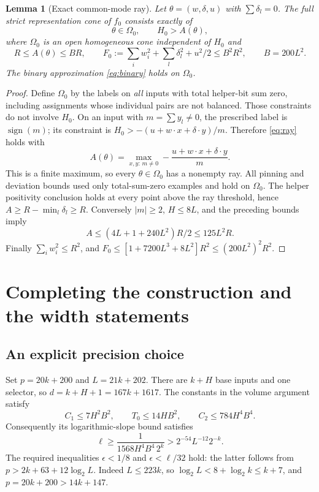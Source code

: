 \documentclass[11pt]{article}
\newtheorem{lemma}[theorem]{Lemma}
\newcommand{\sgn}{\operatorname{sign}}
\begin{document}
\begin{lemma}[Exact common-mode ray]\label{lem:ray}
Let $\theta=(w,\delta,u)$ with $\sum\delta_l=0$. The full strict
representation cone of $f_0$ consists exactly of
\begin{equation}\label{eq:ray}
 \theta\in\Omega_0,\qquad H_0>A(\theta),
\end{equation}
where $\Omega_0$ is an open homogeneous cone independent of $H_0$ and
\begin{equation}\label{eq:raybounds}
 R\le A(\theta)\le BR,\qquad
 F_0:=\sum_iw_i^2+\sum_l\delta_l^2+u^2/2\le B^2R^2,
 \qquad B=200L^2.
\end{equation}
The binary approximation \eqref{eq:binary} holds on $\Omega_0$.
\end{lemma}
\begin{proof}
Define $\Omega_0$ by the labels on \emph{all} inputs with total
helper-bit sum zero, including assignments whose individual pairs are
not balanced. Those constraints do not involve $H_0$. On an input with
$m=\sum y_l\ne0$, the prescribed label is $\sgn(m)$; its constraint is
$H_0>-(u+w\cdot x+\delta\cdot y)/m$. Therefore \eqref{eq:ray} holds with
\[
 A(\theta)=\max_{x,y:\,m\ne0}
       -\frac{u+w\cdot x+\delta\cdot y}{m}.
\]
This is a finite maximum, so every $\theta\in\Omega_0$ has a nonempty
ray. All pinning and deviation bounds used only total-sum-zero examples
and hold on $\Omega_0$. The helper positivity conclusion holds at every
point above the ray threshold, hence
$A\ge R-\min_l\delta_l\ge R$.
Conversely $|m|\ge2$, $H\le8L$, and the preceding bounds imply
\[
 A\le(4L+1+240L^2)R/2\le125L^2R.
\]
Finally $\sum_iw_i^2\le R^2$, and
$F_0\le[1+7200L^3+8L^2]R^2\le(200L^2)^2R^2$.
\end{proof}



\section{Completing the construction and the width statements}

\subsection{An explicit precision choice}

Set $p=20k+200$ and $L=21k+202$. There are $k+H$ base inputs and one
selector, so $d=k+H+1=167k+1617$. The constants in the volume argument
satisfy
\[
 C_1\le7H^2B^2,\qquad T_0\le14HB^2,\qquad C_2\le784H^4B^4.
\]
Consequently its logarithmic-slope bound satisfies
\begin{equation}\label{eq:slopeexplicit}
 \ell\ge\frac1{1568H^4B^4\,2^k}
 >2^{-54}L^{-12}2^{-k}.
\end{equation}
The required inequalities $\epsilon<1/8$ and $\epsilon<\ell/32$ hold:
the latter follows from $p>2k+63+12\log_2 L$.
Indeed $L\le223k$, so $\log_2L<8+\log_2k\le k+7$,
and $p=20k+200>14k+147$.
\end{document}

